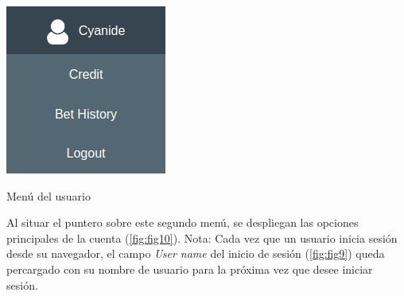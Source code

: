 \documentclass{article}
\begin{document}
\begin{center}
\begin{minipage}[t][][b]{.275\linewidth}
        \centering
        \captionsetup{type=figure}
        \includegraphics[width=.91\linewidth]{fig10}
        \caption{Menú del usuario}
        \label{fig:fig10}
    \end{minipage}
\end{center}
Al situar el puntero sobre este segundo menú, se despliegan las opciones principales de la cuenta (\autoref{fig:fig10}).
\smallbreak
Nota: Cada vez que un usuario inicia sesión desde su navegador, el campo \textit{User name} del inicio de sesión (\autoref{fig:fig9}) queda percargado con su nombre de usuario para la próxima vez que desee iniciar sesión.
\end{document}
